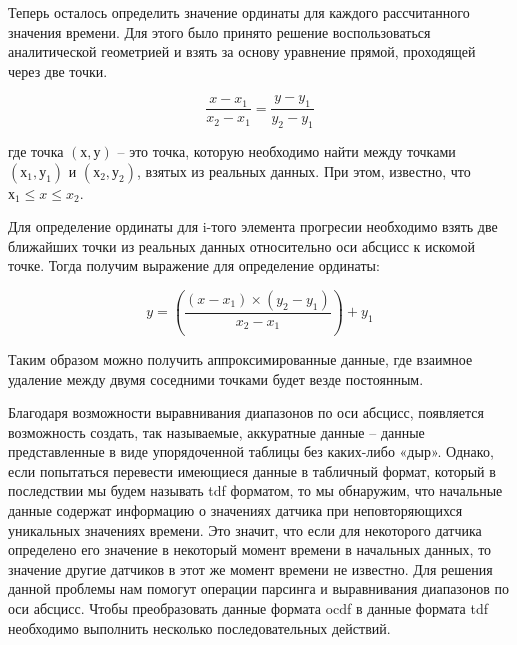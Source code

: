 {  \par \redline Теперь осталось определить значение ординаты для каждого рассчитанного значения времени. Для этого было принято решение воспользоваться аналитической геометрией и взять за основу уравнение прямой, проходящей через две точки.  

  \begin{equation}
    \frac{x - x_1}{x_2 - x_1} = \frac{y - y_1}{y_2 - y_1}
  \end{equation}

  \par \redline где точка $\left(х, у\right)$ – это точка, которую необходимо найти между точками $\left(х_1, у_1\right)$ и $\left(х_2, у_2\right)$, взятых из реальных данных. При этом, известно, что $х_1 \leq x \leq x_2$. 

  \par \redline Для определение ординаты для i-того элемента прогресии необходимо взять две ближайших точки из реальных данных относительно оси абсцисс к искомой точке. Тогда получим выражение для определение ординаты:

  \begin{equation}
    y = \left(\frac{\left(x - x_1\right) \times \left(y_2 - y_1\right)}{x_2 - x_1}\right) + y_1
  \end{equation}

  \par \redline Таким образом можно получить аппроксимированные данные, где взаимное удаление между двумя соседними точками будет везде постоянным.  

  \par \redline Благодаря возможности выравнивания диапазонов по оси абсцисс, появляется возможность создать, так называемые, аккуратные данные – данные представленные в виде упорядоченной таблицы без каких-либо «дыр». Однако, если попытаться перевести имеющиеся данные в табличный формат, который в последствии мы будем называть tdf форматом, то мы обнаружим, что начальные данные содержат информацию о значениях датчика при неповторяющихся уникальных значениях времени. Это значит, что если для некоторого датчика определено его значение в некоторый момент времени в начальных данных, то значение другие датчиков в этот же момент времени не известно. Для решения данной проблемы нам помогут операции парсинга и выравнивания диапазонов по оси абсцисс. Чтобы преобразовать данные формата ocdf в данные формата tdf необходимо выполнить несколько последовательных действий. 

}
